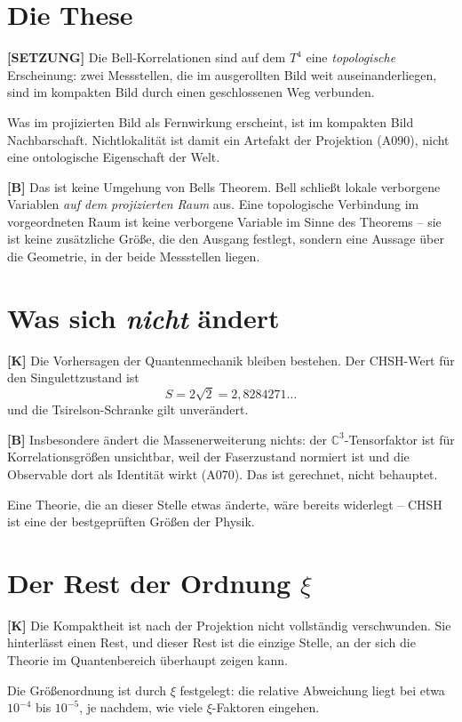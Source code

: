 \section{Die These}

\textbf{[SETZUNG]} Die Bell-Korrelationen sind auf dem $T^4$ eine
\emph{topologische} Erscheinung: zwei Messstellen, die im ausgerollten Bild weit
auseinanderliegen, sind im kompakten Bild durch einen geschlossenen Weg
verbunden.

Was im projizierten Bild als Fernwirkung erscheint, ist im kompakten Bild
Nachbarschaft. Nichtlokalität ist damit ein Artefakt der Projektion (A090), nicht
eine ontologische Eigenschaft der Welt.

\textbf{[B]} Das ist keine Umgehung von Bells Theorem. Bell schließt lokale
verborgene Variablen \emph{auf dem projizierten Raum} aus. Eine topologische
Verbindung im vorgeordneten Raum ist keine verborgene Variable im Sinne des
Theorems -- sie ist keine zusätzliche Größe, die den Ausgang festlegt, sondern
eine Aussage über die Geometrie, in der beide Messstellen liegen.

\section{Was sich \emph{nicht} ändert}

\textbf{[K]} Die Vorhersagen der Quantenmechanik bleiben bestehen. Der
CHSH-Wert für den Singulettzustand ist
\[
  S = 2\sqrt2 = 2{,}8284271\ldots
\]
und die Tsirelson-Schranke gilt unverändert.

\textbf{[B]} Insbesondere ändert die Massenerweiterung nichts: der
$\mathbb{C}^3$-Tensorfaktor ist für Korrelationsgrößen unsichtbar, weil der
Faserzustand normiert ist und die Observable dort als Identität wirkt (A070). Das
ist gerechnet, nicht behauptet.

Eine Theorie, die an dieser Stelle etwas änderte, wäre bereits widerlegt --
CHSH ist eine der bestgeprüften Größen der Physik.

\section{Der Rest der Ordnung $\xi$}

\textbf{[K]} Die Kompaktheit ist nach der Projektion nicht vollständig
verschwunden. Sie hinterlässt einen Rest, und dieser Rest ist die einzige Stelle,
an der sich die Theorie im Quantenbereich überhaupt zeigen kann.

Die Größenordnung ist durch $\xi$ festgelegt: die relative Abweichung liegt
bei etwa $10^{-4}$ bis $10^{-5}$, je nachdem, wie viele
$\xi$-Faktoren eingehen.

